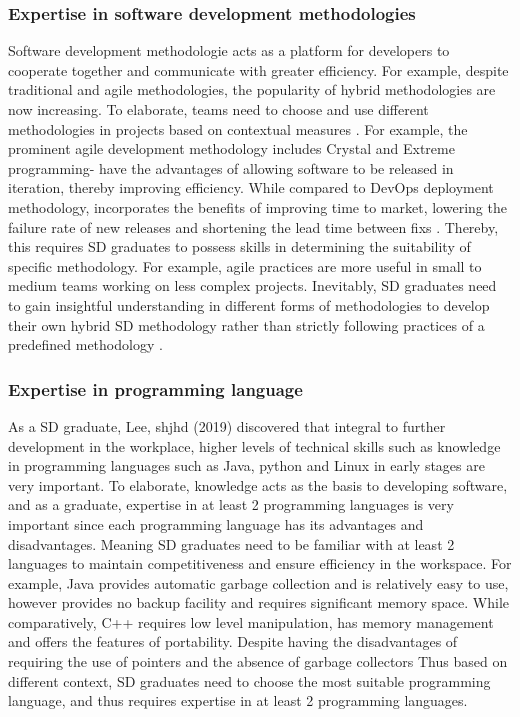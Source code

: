 \documentclass[a4paper, 11pt]{report}
\begin{document}
\subsubsection{Expertise in software development methodologies}
Software development methodologie acts as a platform for developers to cooperate together and communicate with greater efficiency. For example, despite traditional and agile methodologies, the popularity of hybrid methodologies are now increasing. To elaborate, teams need to choose and use different methodologies in projects based on contextual measures \cite{vijayasarathy2015choice}. For example, the prominent agile development methodology includes Crystal and Extreme programming- have the advantages of allowing software to be released in iteration, thereby improving efficiency. While compared to DevOps deployment methodology, incorporates the benefits of improving time to market, lowering the failure rate of new releases and shortening the lead time between fixs \cite{Synopsys2017}. Thereby, this requires SD graduates to possess skills in determining the suitability of specific methodology. For example, agile practices are more useful in small to medium teams working on less complex projects. Inevitably, SD graduates need to gain insightful understanding in different forms of methodologies to develop their own hybrid SD methodology rather than strictly following practices of a predefined  methodology \cite{williams2010agile}. 

\subsubsection{Expertise in programming language}
As a SD graduate, Lee, shjhd (2019) discovered that integral to further development in the workplace, higher levels of technical skills such as knowledge in programming languages such as Java, python and Linux in early stages are very important. To elaborate, knowledge acts as the basis to developing software, and as a graduate, expertise in at least 2 programming languages is very important since each programming language has its advantages and disadvantages. Meaning SD graduates need to be familiar with at least 2 languages to maintain competitiveness and ensure efficiency in the workspace. For example, Java provides automatic garbage collection and is relatively easy to use, however provides no backup facility and requires significant memory space. While comparatively, C++ requires low level manipulation, has memory management and offers the features of portability. Despite having the disadvantages of requiring the use of pointers and the absence of garbage collectors \cite{jain2020review} Thus based on different context, SD graduates need to choose the most suitable programming language, and thus requires expertise in at least 2 programming languages.
\end{document}
